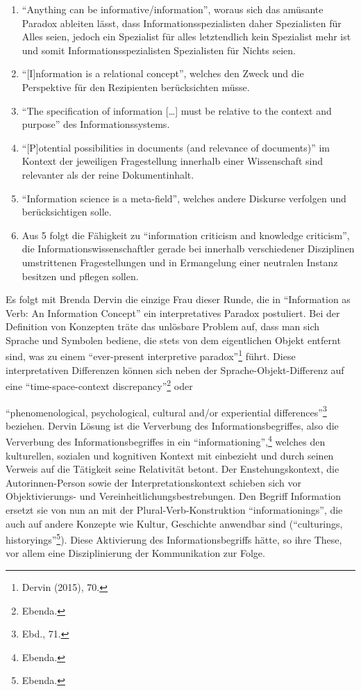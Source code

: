 \documentclass[a4paper,
fontsize=11pt,
oneside,
numbers=noperiodatend,
parskip=half-,
bibliography=totoc,
final
]{scrartcl}
\begin{document}
\begin{enumerate}
\def\labelenumi{\arabic{enumi}.}
\item
  \enquote{Anything can be informative/information}, woraus sich das
  amüsante Paradox ableiten lässt, dass Informationsspezialisten daher
  Spezialisten für Alles seien, jedoch ein Spezialist für alles
  letztendlich kein Spezialist mehr ist und somit
  Informationsspezialisten Spezialisten für Nichts seien.
\item
  \enquote{{[}I{]}nformation is a relational concept}, welches den Zweck
  und die Perspektive für den Rezipienten berücksichten müsse.
\item
  \enquote{The specification of information {[}\ldots{}{]} must be
  relative to the context and purpose} des Informationssystems.
\item
  \enquote{{[}P{]}otential possibilities in documents (and relevance of
  documents)} im Kontext der jeweiligen Fragestellung innerhalb einer
  Wissenschaft sind relevanter als der reine Dokumentinhalt.
\item
  \enquote{Information science is a meta-field}, welches andere Diskurse
  verfolgen und berücksichtigen solle.
\item
  Aus 5 folgt die Fähigkeit zu \enquote{information criticism and
  knowledge criticism}, die Informationswissenschaftler gerade bei
  innerhalb verschiedener Disziplinen umstrittenen Fragestellungen und
  in Ermangelung einer neutralen Instanz besitzen und pflegen sollen.
\end{enumerate}

Es folgt mit Brenda Dervin die einzige Frau dieser Runde, die in
\enquote{Information as Verb: An Information Concept} ein
interpretatives Paradox postuliert. Bei der Definition von Konzepten
träte das unlösbare Problem auf, dass man sich Sprache und Symbolen
bediene, die stets von dem eigentlichen Objekt entfernt sind, was zu
einem \enquote{ever-present interpretive paradox}\footnote{Dervin
  (2015), 70.} führt. Diese interpretativen Differenzen können sich
neben der Sprache-Objekt-Differenz auf eine \enquote{time-space-context
discrepancy}\footnote{Ebenda.} oder

\enquote{phenomenological, psychological, cultural and/or experiential
differences}\footnote{Ebd., 71.} beziehen. Dervin Lösung ist die
Ververbung des Informationsbegriffes, also die Ververbung des
Informationsbegriffes in ein \enquote{informationing},\footnote{Ebenda.}
welches den kulturellen, sozialen und kognitiven Kontext mit einbezieht
und durch seinen Verweis auf die Tätigkeit seine Relativität betont. Der
Enstehungskontext, die Autorinnen-Person sowie der
Interpretationskontext schieben sich vor Objektivierungs- und
Vereinheitlichungsbestrebungen. Den Begriff Information ersetzt sie von
nun an mit der Plural-Verb-Konstruktion \enquote{informationings}, die
auch auf andere Konzepte wie Kultur, Geschichte anwendbar sind
(\enquote{culturings, historyings}\footnote{Ebenda.}). Diese Aktivierung
des Informationsbegriffs hätte, so ihre These, vor allem eine
Disziplinierung der Kommunikation zur Folge.
\end{document}
